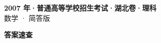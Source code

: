 \documentclass[zihao=-4, a4paper]{ctexart}
\begin{document}
\begin{center}
  {\Large\bfseries 2007 年·普通高等学校招生考试·湖北卷·理科}\\[4pt]
  {\large 数学 · 简答版}
\end{center}
\medskip
{}

\clearpage
{}
\begin{center}{\Large\bfseries 答案速查}\end{center}
\medskip

\end{document}
